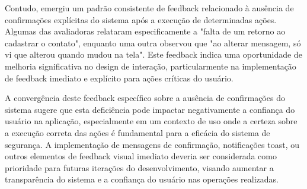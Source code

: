 Contudo, emergiu um padrão consistente de feedback relacionado à ausência de confirmações explícitas do sistema após a execução de determinadas ações. Algumas das avaliadoras relataram especificamente a "falta de um retorno ao cadastrar o contato", enquanto uma outra observou que "ao alterar mensagem, só vi que alterou quando mudou na tela". Este feedback indica uma oportunidade de melhoria significativa no design de interação, particularmente na implementação de feedback imediato e explícito para ações críticas do usuário.

A convergência deste feedback específico sobre a ausência de confirmações do sistema sugere que esta deficiência pode impactar negativamente a confiança do usuário na aplicação, especialmente em um contexto de uso onde a certeza sobre a execução correta das ações é fundamental para a eficácia do sistema de segurança. A implementação de mensagens de confirmação, notificações toast, ou outros elementos de feedback visual imediato deveria ser considerada como prioridade para futuras iterações do desenvolvimento, visando aumentar a transparência do sistema e a confiança do usuário nas operações realizadas.